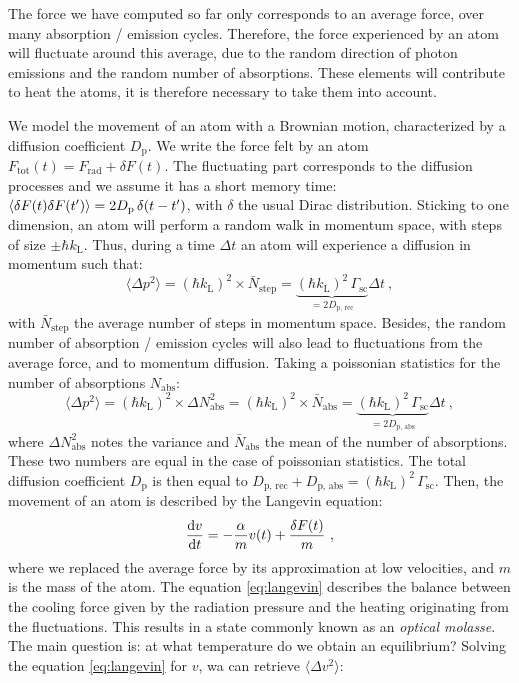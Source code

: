 \documentclass[11pt]{article}
\newcommand{\mathsc}[1]{\mathrm{\scriptscriptstyle {#1}}}
\numberwithin{equation}{section}
\numberwithin{figure}{section}
\begin{document}
The force we have computed so far only corresponds to an average force, over many absorption / emission cycles. Therefore, the force experienced by an atom will fluctuate around this average, due to the random direction of photon emissions and the random number of absorptions. These elements will contribute to heat the atoms, it is therefore necessary to take them into account.

We model the movement of an atom with a Brownian motion, characterized by a diffusion coefficient $D_\text{p}$. We write the force felt by an atom $F_\text{tot}(t) = F_\text{rad} + \delta F(t)$. The fluctuating part corresponds to the diffusion processes and we assume it has a short memory time: $\expval{\delta F(t) \delta F(t')} = 2 D_\text{p} \, \delta(t-t')$, with $\delta$ the usual Dirac distribution. Sticking to one dimension, an atom will perform a random walk in momentum space, with steps of size $\pm \hbar k_\mathsc{L}$. Thus, during a time $\Delta t$ an atom will experience a diffusion in momentum such that:
%
\begin{equation}
	\langle \Delta p^2 \rangle  = (\hbar k_\mathsc{L})^2	\times \bar{N}_\text{step} =  \underbrace{(\hbar k_\mathsc{L})^2\, \Gamma_\text{sc}}_{=2 D_\text{p, rec}} \Delta t~,
\end{equation}
%
with $\bar{N}_\text{step}$ the average number of steps in momentum space. Besides, the random number of absorption / emission cycles will also lead to fluctuations from the average force, and to momentum diffusion. Taking a poissonian statistics for the number of absorptions $N_\text{abs}$:
%
\begin{equation}
	\langle \Delta p^2 \rangle  = (\hbar k_\mathsc{L})^2	\times\Delta N_\text{abs}^2 = (\hbar k_\mathsc{L})^2	\times\bar{N}_\text{abs} =  \underbrace{(\hbar k_\mathsc{ L})^2\, \Gamma_\text{sc}}_{=2 D_\text{p, abs}} \Delta t~,
\end{equation}
%
where $\Delta N_\text{abs}^2$ notes the variance and $\bar{N}_\text{abs}$ the mean of the number of absorptions. These two numbers are equal in the case of poissonian statistics.
The total diffusion coefficient $D_\text{p}$ is then equal to $D_\text{p, rec} +D_\text{p, abs} = (\hbar k_\mathsc{L})^2\, \Gamma_\text{sc}$. Then, the movement of an atom is described by the Langevin equation:
%
\begin{equation}
	\label{eq:langevin}
	\dv{v}{t} = - \frac{\alpha}{m} v(t) + \frac{\delta F(t)}{m}~,
\end{equation}
%
where we replaced the average force by its approximation at low velocities, and $m$ is the mass of the atom. The equation \eqref{eq:langevin} describes the balance between the cooling force given by the radiation pressure and the heating originating from the fluctuations. This results in a state commonly known as an \textit{optical molasse}. The main question is: at what temperature do we obtain an equilibrium? Solving the equation \eqref{eq:langevin} for $v$, wa can retrieve $\langle \Delta v^2 \rangle $:
\end{document}
